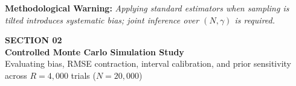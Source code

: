 \documentclass[aspectratio=169,10pt]{beamer}
\begin{document}
\begin{frame}[c]
  \vspace{0.18cm}
  \begin{center}
    {\footnotesize \textbf{\color{headernavy} Methodological Warning: } \textit{Applying standard estimators when sampling is tilted introduces systematic bias; joint inference over $(N, \gamma)$ is required.}}
  \end{center}
\end{frame}

{
\begin{frame}[c,plain]
  \centering
  {\scriptsize \textbf{\color{accentcyan} SECTION 02}}\\[0.25cm]
  {\LARGE \textbf{\color{white} Controlled Monte Carlo Simulation Study}}\\[0.35cm]
  {\small \color{white!70} Evaluating bias, RMSE contraction, interval calibration, and prior sensitivity across $R=4,000$ trials ($N=20,000$)}
\end{frame}
}
\end{document}
